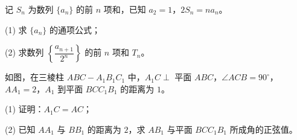\begin{question}
记 $S_n$ 为数列 $\{a_n\}$ 的前 $n$ 项和，已知 $a_2=1$，$2S_n=na_n$。

  (1) 求 $\{a_n\}$ 的通项公式；

  (2) 求数列 $\left\{\dfrac{a_{n+1}}{2^n}\right\}$ 的前 $n$ 项和 $T_n$。

\Needspace{0.4\textheight}
\end{question}
\begin{question}
如图，在三棱柱 $ABC-A_1B_1C_1$ 中，$A_1C\perp$ 平面 $ABC$，$\angle ACB=90^\circ$，$AA_1=2$，$A_1$ 到平面 $BCC_1B_1$ 的距离为 $1$。
\nopagebreak[4]
\begin{center}\end{center}
\nopagebreak[4]
  (1) 证明：$A_1C=AC$；

  (2) 已知 $AA_1$ 与 $BB_1$ 的距离为 $2$，求 $AB_1$ 与平面 $BCC_1B_1$ 所成角的正弦值。

\end{question}
